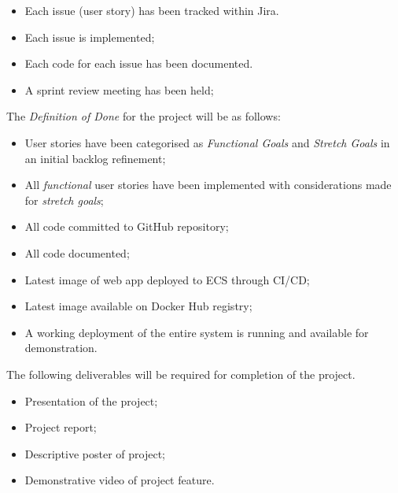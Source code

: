 	\begin{itemize}
		\item Each issue (user story) has been tracked within Jira.
		\item Each issue is implemented;
		\item Each code for each issue has been documented.
		\item A sprint review meeting has been held;		
	\end{itemize}
	
	\noindent The \textit{Definition of Done} for the project  will be as follows:
	
	\begin{itemize}
		\item User stories have been categorised as \textit{Functional Goals} and \textit{Stretch Goals} in an initial backlog refinement;
		\item All \textit{functional} user stories have been implemented with considerations made for \textit{stretch goals};
		\item All code committed to GitHub repository;
		\item All code documented;
		\item Latest image of web app deployed to ECS through CI/CD;
		\item Latest image available on Docker Hub registry;
		\item A working deployment of the entire system is running and available for demonstration.
	\end{itemize}
	 
	 \noindent The following deliverables will be required for completion of the project. 
	 \begin{itemize}
	 	\item Presentation of the project;
	 	\item Project report;
	 	\item Descriptive poster of project;
	 	\item Demonstrative video of project feature.
	 \end{itemize}